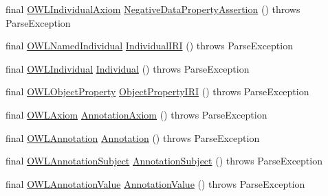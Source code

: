 \begin{DoxyCompactItemize}
\item 
final \hyperlink{interfaceorg_1_1semanticweb_1_1owlapi_1_1model_1_1_o_w_l_individual_axiom}{O\-W\-L\-Individual\-Axiom} \hyperlink{classorg_1_1coode_1_1owlapi_1_1functionalparser_1_1_o_w_l_functional_syntax_parser_a0933db94c4507b629e7b7588f9a535e8}{Negative\-Data\-Property\-Assertion} ()  throws Parse\-Exception 
\item 
final \hyperlink{interfaceorg_1_1semanticweb_1_1owlapi_1_1model_1_1_o_w_l_named_individual}{O\-W\-L\-Named\-Individual} \hyperlink{classorg_1_1coode_1_1owlapi_1_1functionalparser_1_1_o_w_l_functional_syntax_parser_ae11c7442728b5cf604a89b3e61d3e5a4}{Individual\-I\-R\-I} ()  throws Parse\-Exception 
\item 
final \hyperlink{interfaceorg_1_1semanticweb_1_1owlapi_1_1model_1_1_o_w_l_individual}{O\-W\-L\-Individual} \hyperlink{classorg_1_1coode_1_1owlapi_1_1functionalparser_1_1_o_w_l_functional_syntax_parser_a248e53744df7f532c992edb9e6b4d67b}{Individual} ()  throws Parse\-Exception 
\item 
final \hyperlink{interfaceorg_1_1semanticweb_1_1owlapi_1_1model_1_1_o_w_l_object_property}{O\-W\-L\-Object\-Property} \hyperlink{classorg_1_1coode_1_1owlapi_1_1functionalparser_1_1_o_w_l_functional_syntax_parser_a056822b1010ef0bb6362850c60eac9a4}{Object\-Property\-I\-R\-I} ()  throws Parse\-Exception 
\item 
final \hyperlink{interfaceorg_1_1semanticweb_1_1owlapi_1_1model_1_1_o_w_l_axiom}{O\-W\-L\-Axiom} \hyperlink{classorg_1_1coode_1_1owlapi_1_1functionalparser_1_1_o_w_l_functional_syntax_parser_af8ce765c0b56c7eeccfe51841594f599}{Annotation\-Axiom} ()  throws Parse\-Exception 
\item 
final \hyperlink{interfaceorg_1_1semanticweb_1_1owlapi_1_1model_1_1_o_w_l_annotation}{O\-W\-L\-Annotation} \hyperlink{classorg_1_1coode_1_1owlapi_1_1functionalparser_1_1_o_w_l_functional_syntax_parser_abae4f4340e0bff208ac4013c4d7c4223}{Annotation} ()  throws Parse\-Exception 
\item 
final \hyperlink{interfaceorg_1_1semanticweb_1_1owlapi_1_1model_1_1_o_w_l_annotation_subject}{O\-W\-L\-Annotation\-Subject} \hyperlink{classorg_1_1coode_1_1owlapi_1_1functionalparser_1_1_o_w_l_functional_syntax_parser_a849952f06791c9cb8ce949fcc6a5a60d}{Annotation\-Subject} ()  throws Parse\-Exception 
\item 
final \hyperlink{interfaceorg_1_1semanticweb_1_1owlapi_1_1model_1_1_o_w_l_annotation_value}{O\-W\-L\-Annotation\-Value} \hyperlink{classorg_1_1coode_1_1owlapi_1_1functionalparser_1_1_o_w_l_functional_syntax_parser_ae97beb08dbb67fea3e884b990d79c6c1}{Annotation\-Value} ()  throws Parse\-Exception 

\end{DoxyCompactItemize}
